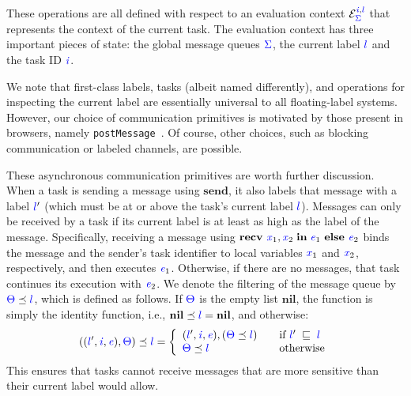 \documentclass{llncs}
\newcommand{\Varid}[1]{\mathit{#1}}
\begin{document}
These operations are all defined with respect to an evaluation context
\ensuremath{\mathcal{E}_{\ifc{\Sigma}}^{\ifc{\Varid{i}},\ifc{l}}} that represents the context of the current task.
The evaluation context has three important pieces of
state: the global message queues \ensuremath{\ifc{\Sigma}}, the current label \ensuremath{\ifc{l}} and the task ID \ensuremath{\ifc{\Varid{i}}}.

We note that first-class labels, tasks (albeit named differently), and
operations for inspecting the current label are essentially universal to
all floating-label systems.
However, our choice of communication primitives is motivated by
those present in browsers, namely \texttt{postMessage}~\cite{webmessaging}.
Of course, other choices, such as blocking communication or labeled channels,
are possible. 

These asynchronous communication primitives are worth further
discussion.  When a task is sending a message using \ensuremath{\mathbf{send}}, it also labels that
message with a label \ensuremath{\ifc{l}'} (which must be at or above the task's current label \ensuremath{\ifc{l}}).
Messages can only be received by a task if its current label is
at least as high as the label of the message.
Specifically, receiving a message using
$\ensuremath{\mathbf{recv}\ \ifc{\Varid{x}}_{1},\ifc{\Varid{x}}_{2}\;\mathbf{in}\;\ifc{\Varid{e}}_{1}\ \mathbf{else}\ \ifc{\Varid{e}}_{2}}$
binds the message and the sender's task identifier
to local variables \ensuremath{\ifc{\Varid{x}}_{1}} and \ensuremath{\ifc{\Varid{x}}_{2}}, respectively, and then executes \ensuremath{\ifc{\Varid{e}}_{1}}.
Otherwise, if there are no messages, that task continues its execution with \ensuremath{\ifc{\Varid{e}}_{2}}.
We denote the filtering of the message queue by \ensuremath{\ifc{\Theta}\preceq\ifc{l}},
which is defined as follows.
If \ensuremath{\ifc{\Theta}} is the empty list \ensuremath{\mathbf{nil}}, the
function is simply the identity function, i.e.,
\ensuremath{\mathbf{nil}\preceq\ifc{l}\mathrel{=}\mathbf{nil}}, and otherwise:
\[
\ensuremath{((\ifc{l}',\ifc{\Varid{i}},\ifc{\Varid{e}}),\ifc{\Theta})\preceq\ifc{l}} = \left\{
\begin{array}{l l}
\ensuremath{(\ifc{l}',\ifc{\Varid{i}},\ifc{\Varid{e}}),(\ifc{\Theta}\preceq\ifc{l})} & \quad \text{if \ensuremath{\ifc{l}'\;\flows{}\;\ifc{l}}}\\
\ensuremath{\ifc{\Theta}\preceq\ifc{l}} & \quad \text{otherwise}
\end{array} \right.
\]
This ensures that tasks cannot receive messages that are more sensitive
than their current label would allow.
\end{document}
